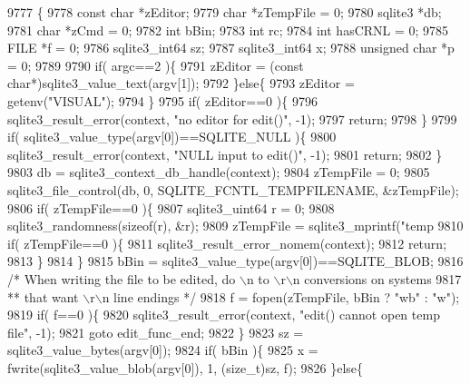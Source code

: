 \begin{DoxyCode}
9777  \{
9778   \textcolor{keyword}{const} \textcolor{keywordtype}{char} *zEditor;
9779   \textcolor{keywordtype}{char} *zTempFile = 0;
9780   sqlite3 *db;
9781   \textcolor{keywordtype}{char} *zCmd = 0;
9782   \textcolor{keywordtype}{int} bBin;
9783   \textcolor{keywordtype}{int} rc;
9784   \textcolor{keywordtype}{int} hasCRNL = 0;
9785   FILE *f = 0;
9786   sqlite3_int64 sz;
9787   sqlite3_int64 x;
9788   \textcolor{keywordtype}{unsigned} \textcolor{keywordtype}{char} *p = 0;
9789 
9790   \textcolor{keywordflow}{if}( argc==2 )\{
9791     zEditor = (\textcolor{keyword}{const} \textcolor{keywordtype}{char}*)sqlite3_value_text(argv[1]);
9792   \}\textcolor{keywordflow}{else}\{
9793     zEditor = getenv(\textcolor{stringliteral}{"VISUAL"});
9794   \}
9795   \textcolor{keywordflow}{if}( zEditor==0 )\{
9796     sqlite3_result_error(context, \textcolor{stringliteral}{"no editor for edit()"}, -1);
9797     \textcolor{keywordflow}{return};
9798   \}
9799   \textcolor{keywordflow}{if}( sqlite3_value_type(argv[0])==SQLITE_NULL )\{
9800     sqlite3_result_error(context, \textcolor{stringliteral}{"NULL input to edit()"}, -1);
9801     \textcolor{keywordflow}{return};
9802   \}
9803   db = sqlite3_context_db_handle(context);
9804   zTempFile = 0;
9805   sqlite3_file_control(db, 0, SQLITE_FCNTL_TEMPFILENAME, &zTempFile);
9806   \textcolor{keywordflow}{if}( zTempFile==0 )\{
9807     sqlite3_uint64 r = 0;
9808     sqlite3_randomness(\textcolor{keyword}{sizeof}(r), &r);
9809     zTempFile = sqlite3_mprintf(\textcolor{stringliteral}{"temp%
9810     \textcolor{keywordflow}{if}( zTempFile==0 )\{
9811       sqlite3_result_error_nomem(context);
9812       \textcolor{keywordflow}{return};
9813     \}
9814   \}
9815   bBin = sqlite3_value_type(argv[0])==SQLITE_BLOB;
9816   \textcolor{comment}{/* When writing the file to be edited, do \(\backslash\)n to \(\backslash\)r\(\backslash\)n conversions on systems}
9817 \textcolor{comment}{  ** that want \(\backslash\)r\(\backslash\)n line endings */}
9818   f = fopen(zTempFile, bBin ? \textcolor{stringliteral}{"wb"} : \textcolor{stringliteral}{"w"});
9819   \textcolor{keywordflow}{if}( f==0 )\{
9820     sqlite3_result_error(context, \textcolor{stringliteral}{"edit() cannot open temp file"}, -1);
9821     \textcolor{keywordflow}{goto} edit\_func\_end;
9822   \}
9823   sz = sqlite3_value_bytes(argv[0]);
9824   \textcolor{keywordflow}{if}( bBin )\{
9825     x = fwrite(sqlite3_value_blob(argv[0]), 1, (\textcolor{keywordtype}{size\_t})sz, f);
9826   \}\textcolor{keywordflow}{else}\{
}
\end{DoxyCode}
